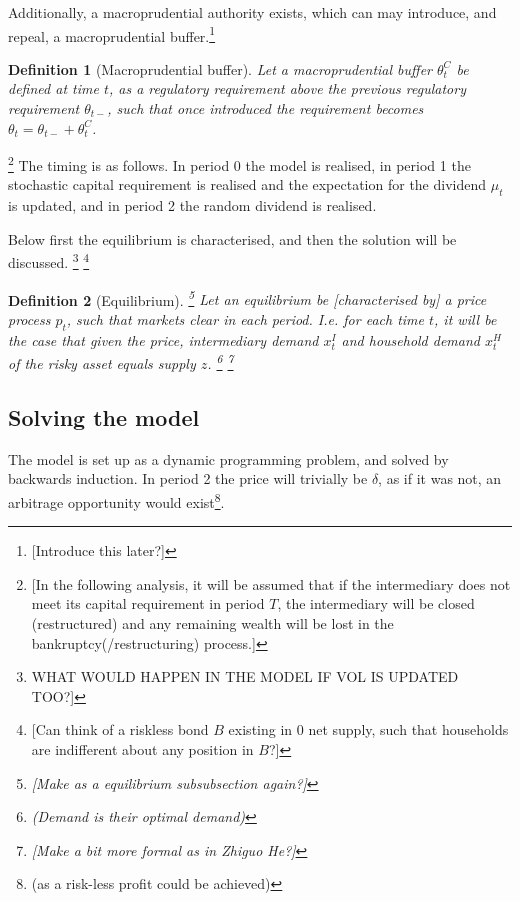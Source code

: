 \documentclass[11pt]{article}
\newtheorem{definition}{Definition}%
\begin{document}
Additionally, a macroprudential authority exists, which can may introduce, and repeal, a macroprudential buffer.\footnote{[Introduce this later?]}

\begin{definition}[Macroprudential buffer]
Let a macroprudential buffer $\theta^C_t$ be defined at time $t$, as a regulatory requirement above the previous regulatory requirement $\theta_{t-}$, such that once introduced the requirement becomes $\theta_t = \theta_{t-} + \theta^C_t$.
\end{definition}


\footnote{[In the following analysis, it will be assumed that if the intermediary does not meet its capital requirement in period $T$, the intermediary will be closed (restructured) and any remaining wealth will be lost in the bankruptcy(/restructuring) process.]} The timing is as follows. In period 0 the model is realised, in period 1  the stochastic capital requirement is realised and the expectation for the dividend $\mu_t$ is updated, and in period 2 the random dividend is realised.

Below first the equilibrium is characterised, and then the solution will be discussed.
\footnote{WHAT WOULD HAPPEN IN THE MODEL IF VOL IS UPDATED TOO?]}
\footnote{[Can think of a riskless bond $B$ existing in 0 net supply, such that households are indifferent about any position in $B$?]}


\begin{definition}[Equilibrium] \label{d_eqm}
\footnote{[Make as a equilibrium subsubsection again?]} Let an equilibrium be [characterised by] a price process $p_t$, such that markets clear in each period. I.e. for each time $t$, it will be the case that given the price, intermediary demand $x^I_t$ and household demand $x^H_t$ of the risky asset equals supply $z$. \footnote{(Demand is their optimal demand)} \footnote{[Make a bit more formal as in Zhiguo He?]}
\end{definition}

\subsection*{Solving the model}
The model is set up as a dynamic programming problem, and solved by backwards induction. In period 2 the price will trivially be $\delta$, as if it was not, an arbitrage opportunity would exist\footnote{(as a risk-less profit could be achieved)}.
\end{document}
